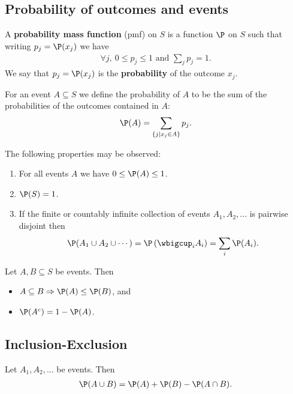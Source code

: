 \documentclass{article}
\begin{document}
\subsection{Probability of outcomes and events}
\begin{definition}
    A \textbf{probability mass function} (pmf) on $S$ is a function $\P$ on $S$ such that writing $p_j=\P(x_j)$ we have
    \begin{align*}
        \forall j,\:0 \leq p_j \leq 1 \text{ and } \sum_j p_j = 1.
    \end{align*}
    We say that $p_j=\P(x_j)$ is the \textbf{probability} of the outcome $x_j$.
\end{definition}
\begin{definition}
    For an event $A\subseteq S$ we define the probability of $A$ to be the sum of the probabilities of the outcomes contained in 
    $A$: 
    \begin{align*}
        \P(A) = \sum_{\{j | x_j \in A\}} p_j.
    \end{align*}
\end{definition}
\begin{theorem}
    The following properties may be observed:
    \begin{enumerate}
        \item For all events $A$ we have $0\leq \P(A) \leq 1$.
        \item $\P(S)=1$.
        \item If the finite or countably infinite collection of events $A_1, A_2, ...$ is pairwise disjoint then
        \begin{align*}
            \P(A_1 \cup A_2 \cup \cdots) = \P\left(\wbigcup_i A_i\right) = \sum_i \P(A_i).
        \end{align*}
    \end{enumerate}
\end{theorem}
\begin{theorem}
    Let $A,B\subseteq S$ be events. Then 
    \begin{itemize}
        \item $A \subseteq B \Rightarrow \P(A) \leq \P(B)$, and
        \item $\P(A^c) = 1 - \P(A)$.
    \end{itemize}
\end{theorem}
\subsection{Inclusion-Exclusion}
\begin{theorem}
    Let $A_1, A_2, ...$ be events. Then
    \begin{align*}
        \P(A\cup B)=\P(A) + \P(B) - \P(A\cap B).
    \end{align*}
\end{theorem}
\end{document}
